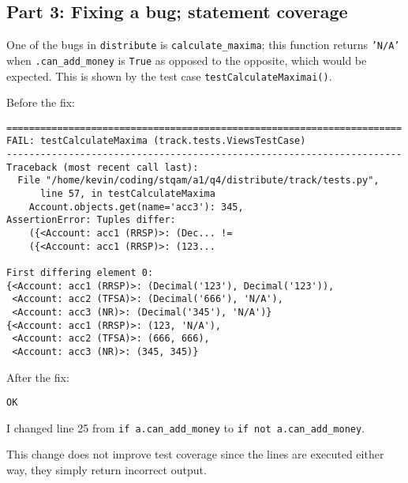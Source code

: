\documentclass[12pt]{article}
\begin{document}
\subsection*{Part 3: Fixing a bug; statement coverage}
One of the bugs in {\tt distribute} is {\tt calculate\_maxima}; this function returns {\tt 'N/A'} when {\tt .can\_add\_money} is {\tt True} as opposed to the opposite, which would be expected. This is shown by the test case {\tt testCalculateMaximai()}.

Before the fix:
\begin{verbatim}
======================================================================
FAIL: testCalculateMaxima (track.tests.ViewsTestCase)
----------------------------------------------------------------------
Traceback (most recent call last):
  File "/home/kevin/coding/stqam/a1/q4/distribute/track/tests.py",
      line 57, in testCalculateMaxima
    Account.objects.get(name='acc3'): 345,
AssertionError: Tuples differ:
    ({<Account: acc1 (RRSP)>: (Dec... !=
    ({<Account: acc1 (RRSP)>: (123...

First differing element 0:
{<Account: acc1 (RRSP)>: (Decimal('123'), Decimal('123')),
 <Account: acc2 (TFSA)>: (Decimal('666'), 'N/A'),
 <Account: acc3 (NR)>: (Decimal('345'), 'N/A')}
{<Account: acc1 (RRSP)>: (123, 'N/A'),
 <Account: acc2 (TFSA)>: (666, 666),
 <Account: acc3 (NR)>: (345, 345)}
\end{verbatim}

After the fix:
\begin{verbatim}
OK
\end{verbatim}

I changed line 25 from {\tt if a.can\_add\_money} to {\tt if not a.can\_add\_money}.

This change does not improve test coverage since the lines are executed either way, they simply return incorrect output.
\end{document}
